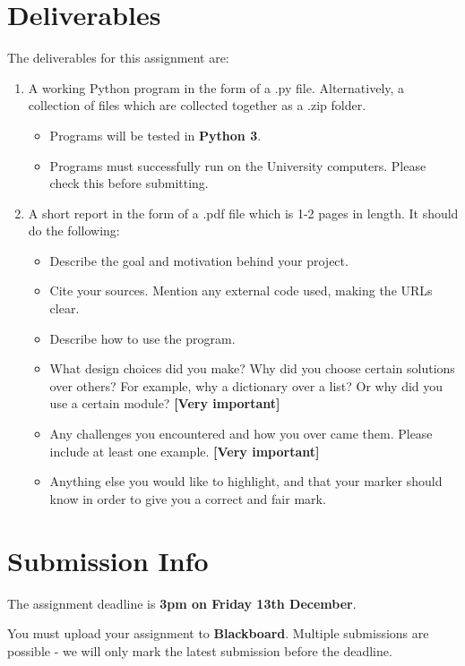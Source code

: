 \documentclass[12pt]{report}
\begin{document}
\section*{Deliverables}
The deliverables for this assignment are:
\begin{enumerate}
    \item A working Python program in the form of a .py file. Alternatively, a collection of files which are collected together as a .zip folder.
    \begin{itemize}
        \item Programs will be tested in \textbf{Python 3}.
        \item Programs must successfully run on the University computers. Please check this before submitting.
    \end{itemize}
    \item A short report in the form of a .pdf file which is 1-2 pages in length. It should do the following:
    \begin{itemize}
        \item Describe the goal and motivation behind your project.
        \item Cite your sources. Mention any external code used, making the URLs clear.
        \item Describe how to use the program.
        \item What design choices did you make? Why did you choose certain solutions over others? For example, why a dictionary over a list? Or why did you use a certain module? \textbf{[Very important]}
        \item Any challenges you encountered and how you over came them. Please include at least one example. \textbf{[Very important]}
        \item Anything else you would like to highlight, and that your marker should know in order to give you a correct and fair mark.
    \end{itemize}
\end{enumerate}

\section*{Submission Info}
The assignment deadline is \textbf{3pm on Friday 13th December}. 

\bigskip

You must upload your assignment to \textbf{Blackboard}. Multiple submissions are possible - we will only mark the latest submission before the deadline.
\end{document}
